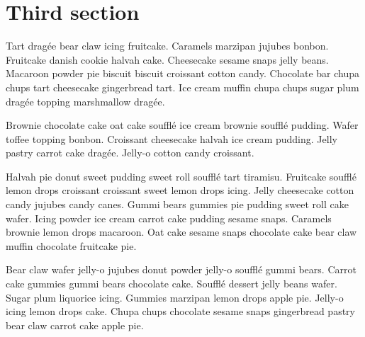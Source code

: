 \section{Third section}

Tart dragée bear claw icing fruitcake. Caramels marzipan jujubes bonbon. Fruitcake danish cookie halvah cake. Cheesecake sesame snaps jelly beans. Macaroon powder pie biscuit biscuit croissant cotton candy. Chocolate bar chupa chups tart cheesecake gingerbread tart. Ice cream muffin chupa chups sugar plum dragée topping marshmallow dragée. 

Brownie chocolate cake oat cake soufflé ice cream brownie soufflé pudding. Wafer toffee topping bonbon. Croissant cheesecake halvah ice cream pudding. Jelly pastry carrot cake dragée. Jelly-o cotton candy croissant.

Halvah pie donut sweet pudding sweet roll soufflé tart tiramisu. Fruitcake soufflé lemon drops croissant croissant sweet lemon drops icing. Jelly cheesecake cotton candy jujubes candy canes. Gummi bears gummies pie pudding sweet roll cake wafer. Icing powder ice cream carrot cake pudding sesame snaps. Caramels brownie lemon drops macaroon. Oat cake sesame snaps chocolate cake bear claw muffin chocolate fruitcake pie.

Bear claw wafer jelly-o jujubes donut powder jelly-o soufflé gummi bears. Carrot cake gummies gummi bears chocolate cake. Soufflé dessert jelly beans wafer. Sugar plum liquorice icing. Gummies marzipan lemon drops apple pie. Jelly-o icing lemon drops cake. Chupa chups chocolate sesame snaps gingerbread pastry bear claw carrot cake apple pie.